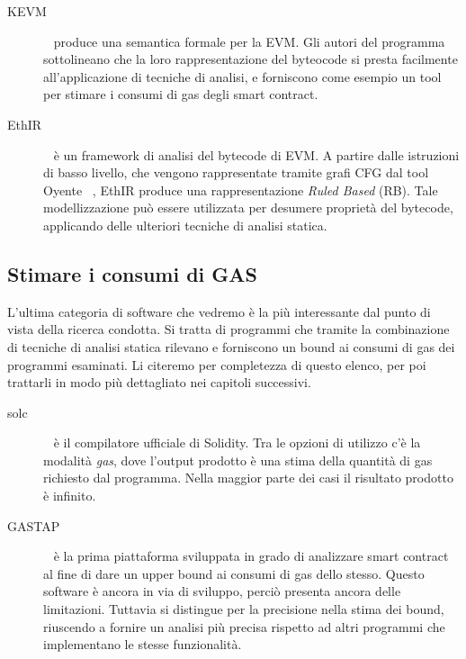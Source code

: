 \begin{description}

    \item[KEVM] ~\cite{hildenbrandt2017kevm} produce una semantica formale per la EVM. Gli autori del programma sottolineano che la loro rappresentazione del byteocode si presta facilmente all'applicazione di tecniche di analisi, e forniscono come esempio un tool per stimare i consumi di gas degli smart contract.\newline

    \item[EthIR] ~\cite{albert2018ethir} è un framework di analisi del bytecode di EVM. A partire dalle istruzioni di basso livello, che vengono rappresentate tramite grafi CFG dal tool Oyente ~\cite{}, EthIR produce una rappresentazione \textit{Ruled Based} (RB). Tale modellizzazione può essere utilizzata per desumere proprietà del bytecode, applicando delle ulteriori tecniche di analisi statica.\newline
    
\end{description}

\subsection{Stimare i consumi di GAS}

L'ultima categoria di software che vedremo è la più interessante dal punto di vista della ricerca condotta. Si tratta di programmi che tramite la combinazione di tecniche di analisi statica rilevano e forniscono un bound ai consumi di gas dei programmi esaminati.\newline
\indent Li citeremo per completezza di questo elenco, per poi trattarli in modo più dettagliato nei capitoli successivi.\newline

\begin{description}

    \item[solc] ~\cite{solidity-docs} è il compilatore ufficiale di Solidity. Tra le opzioni di utilizzo c'è la modalità \textit{gas}, dove l'output prodotto è una stima della quantità di gas richiesto dal programma. Nella maggior parte dei casi il risultato prodotto è infinito.\newline

    \item[GASTAP] ~\cite{DBLP:journals/corr/abs-1811-10403} è la prima piattaforma sviluppata in grado di analizzare smart contract al fine di dare un upper bound ai consumi di gas dello stesso. Questo software è ancora in via di sviluppo, perciò presenta ancora delle limitazioni. Tuttavia si distingue per la precisione nella stima dei bound, riuscendo a fornire un analisi più precisa rispetto ad altri programmi che implementano le stesse funzionalità. 

\end{description}



